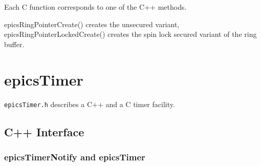 Each C function corresponds to one of the C++ methods.

epicsRingPointerCreate() creates the unsecured variant, epicsRingPointerLockedCreate() creates the spin lock secured variant of the ring buffer.


\section{epicsTimer}

\verb|epicsTimer.h| describes a C++ and a C timer facility.

\subsection{C++ Interface}

\subsubsection{epicsTimerNotify and epicsTimer}

